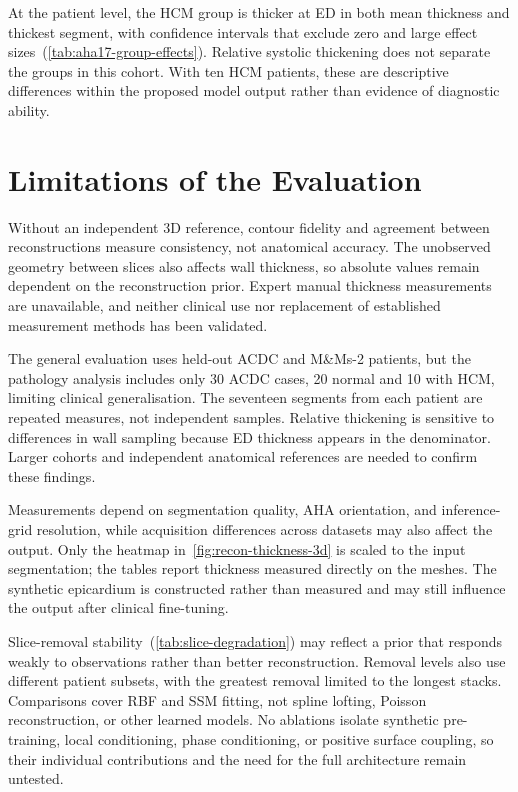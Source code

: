 At the patient level, the HCM group is thicker at ED in both mean thickness
and thickest segment, with
confidence intervals that exclude zero and large effect sizes~(\cref{tab:aha17-group-effects}). Relative systolic thickening does not
separate the groups in this cohort. With ten HCM patients, these are
descriptive differences within the proposed model output rather than evidence of
diagnostic ability.

\section{Limitations of the Evaluation}
\label{sec:threats}
\noindent
Without an independent 3D reference, contour fidelity and agreement between
reconstructions measure consistency, not anatomical accuracy. The unobserved
geometry between slices also affects wall thickness, so absolute values remain
dependent on the reconstruction prior. Expert manual thickness measurements
are unavailable, and neither clinical use nor replacement of established
measurement methods has been validated.

The general evaluation uses held-out ACDC and M\&Ms-2 patients, but the
pathology analysis includes only 30 ACDC cases, 20 normal and 10 with HCM,
limiting clinical generalisation. The seventeen segments from each patient are
repeated measures, not independent samples. Relative thickening is sensitive
to differences in wall sampling because ED thickness appears in the
denominator. Larger cohorts and independent anatomical references are needed
to confirm these findings.

Measurements depend on segmentation quality, AHA orientation, and inference-grid
resolution, while acquisition differences across datasets may also affect the
output. Only the heatmap in~\cref{fig:recon-thickness-3d} is scaled to the input
segmentation; the tables report thickness measured directly on the meshes.
The synthetic epicardium is constructed rather than measured and may still
influence the output after clinical fine-tuning.

Slice-removal stability~(\cref{tab:slice-degradation}) may reflect a prior that
responds weakly to observations rather than better reconstruction. Removal
levels also use different patient subsets, with the greatest removal limited
to the longest stacks. Comparisons cover RBF and SSM fitting, not spline
lofting, Poisson reconstruction, or other learned models. No ablations isolate
synthetic pre-training, local conditioning, phase conditioning, or positive
surface coupling, so their individual contributions and the need for the full
architecture remain untested.
